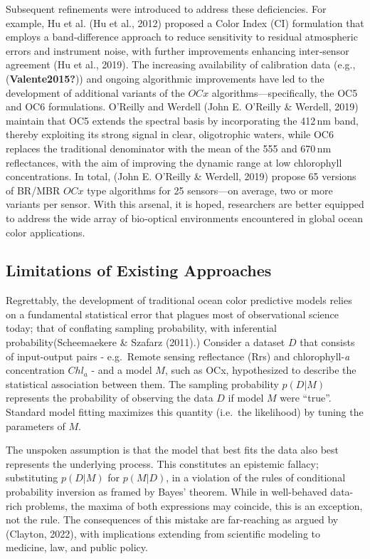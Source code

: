 \documentclass[
]{agujournal2019}
\begin{document}
Subsequent refinements were introduced to address these deficiencies.
For example, Hu et al. (Hu et al., 2012) proposed a Color Index (CI)
formulation that employs a band‑difference approach to reduce
sensitivity to residual atmospheric errors and instrument noise, with
further improvements enhancing inter‑sensor agreement (Hu et al., 2019).
The increasing availability of calibration data (e.g.,
(\textbf{Valente2015?})) and ongoing algorithmic improvements have led
to the development of additional variants of the \(OCx\)
algorithms---specifically, the OC5 and OC6 formulations. O'Reilly and
Werdell (John E. O'Reilly \& Werdell, 2019) maintain that OC5 extends
the spectral basis by incorporating the 412\,nm band, thereby exploiting
its strong signal in clear, oligotrophic waters, while OC6 replaces the
traditional denominator with the mean of the 555 and 670\,nm
reflectances, with the aim of improving the dynamic range at low
chlorophyll concentrations. In total, (John E. O'Reilly \& Werdell,
2019) propose 65 versions of BR/MBR \(OCx\) type algorithms for 25
sensors---on average, two or more variants per sensor. With this
arsenal, it is hoped, researchers are better equipped to address the
wide array of bio‑optical environments encountered in global ocean color
applications.

\subsection{Limitations of Existing
Approaches}\label{limitations-of-existing-approaches}

Regrettably, the development of traditional ocean color predictive
models relies on a fundamental statistical error that plagues most of
observational science today; that of conflating sampling probability,
with inferential probability(Scheemaekere \& Szafarz (2011).) Consider a
dataset \(D\) that consists of input-output pairs - e.g.~Remote sensing
reflectance (Rrs) and chlorophyll-\emph{a} concentration \(Chl_a\) - and
a model \(M\), such as OCx, hypothesized to describe the statistical
association between them. The sampling probability \(p(D|M)\) represents
the probability of observing the data \(D\) if model \(M\) were
``true''. Standard model fitting maximizes this quantity (i.e.~the
likelihood) by tuning the parameters of \(M\).

The unspoken assumption is that the model that best fits the data also
best represents the underlying process. This constitutes an epistemic
fallacy; substituting \(p(D|M)\) for \(p(M|D)\), in a violation of the
rules of conditional probability inversion as framed by Bayes' theorem.
While in well-behaved data-rich problems, the maxima of both expressions
may coincide, this is an exception, not the rule. The consequences of
this mistake are far-reaching as argued by (Clayton, 2022), with
implications extending from scientific modeling to medicine, law, and
public policy.
\end{document}

